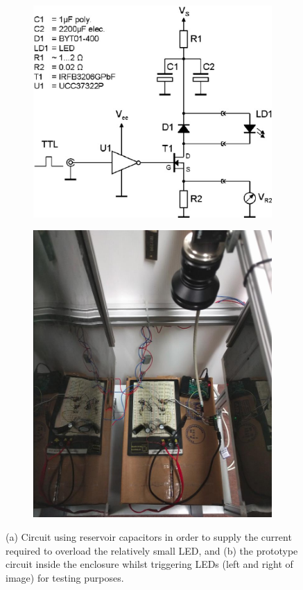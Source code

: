 \documentclass[fleqn,twoside,12pt]{report}
\begin{document}
\begin{figure}[h]
	\centering
	\begin{subfigure}{0.5\textwidth}
		\centering
		\includegraphics[width=0.9\linewidth]{pulse_circuit.png}
		\caption{}
		\label{fig:pulse_circuit}
	\end{subfigure}%
	\begin{subfigure}{0.5\textwidth}
		\centering
		\includegraphics[width=0.8\linewidth]{breadboard.jpg}
		\caption{}
		\label{fig:breadboard}
	\end{subfigure}%
	\caption{(a) Circuit using reservoir capacitors in order to supply the current required to overload the relatively small LED, and (b) the prototype circuit inside the enclosure whilst triggering LEDs (left and right of image) for testing purposes.}
	\label{}
\end{figure}
\end{document}
